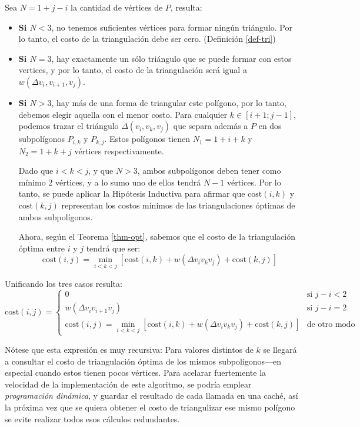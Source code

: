 \documentclass[tiny]{corsage}
\newcommand{\cost}[1]{\text{cost}(#1)}
\theoremstyle{plain}
\theoremstyle{definition}
\begin{document}
	Sea $N = 1 + j - i$ la cantidad de vértices de $P$, resulta:
	\begin{itemize}
		\item \textbf{Si $N < 3$}, no tenemos suficientes vértices para formar ningún triángulo.  Por lo tanto, el costo de la triangulación debe ser cero.  (Definición \ref{def-tri})
		\item \textbf{Si $N = 3$}, hay exactamente un sólo triángulo que se puede formar con estos vertices, y por lo tanto, el costo de la triangulación será igual a $w(\Delta{v_i,v_{i+1},v_j})$.
		\item \textbf{Si $N > 3$}, hay más de una forma de triangular este polígono, por lo tanto, debemos elegir aquella con el menor costo.  Para cualquier $k \in [i + 1; j - 1]$, podemos trazar el triángulo $\Delta(v_i,v_k,v_j)$ que separa además a $P$ en dos subpolígonos $P_{i,k}$ y $P_{k,j}$.  Estos polígonos tienen $N_1 = 1 + i + k$ y $N_2 = 1 + k + j$ vértices respectivamente.

			Dado que $i < k < j$, y que $N > 3$, ambos subpolígonos deben tener como mínimo 2 vértices, y a lo sumo uno de ellos tendrá $N - 1$ vértices.  Por lo tanto, se puede aplicar la Hipótesis Inductiva para afirmar que $\cost{i, k}$ y $\cost{k, j}$ representan los costos mínimos de las triangulaciones óptimas de ambos subpolígonos.

			Ahora, según el Teorema \ref{thm-opt}, sabemos que el costo de la triangulación óptima entre $i$ y $j$ tendrá que ser:
			\[ \cost{i, j} = \min_{i < k < j}{\left [ \cost{i, k} + w(\Delta{v_iv_kv_j}) + \cost{k, j} \right ]} \]
	\end{itemize}

	Unificando los tres casos resulta:
	\begin{equation}
		\cost{i, j} = \left \{ \begin{array}{ll}
			0 & \text{si } j - i < 2 \\
			w(\Delta{v_iv_{i + 1}v_j}) & \text{si } j - i = 2 \\
			\cost{i, j} = \displaystyle\min_{i < k < j}{\left [ \cost{i, k} + w(\Delta{v_iv_kv_j}) + \cost{k, j} \right ]} & \text{de otro modo}
		\end{array}\right .
		\label{def-cost}
	\end{equation}

	Nótese que esta expresión es muy recursiva:  Para valores distintos de $k$ se llegará a consultar el costo de triangulación óptima de los mismos subpolígonos---en especial cuando estos tienen pocos vértices.  Para acelarar fuertemente la velocidad de la implementación de este algoritmo, se podría emplear \emph{programación dinámica}, y guardar el resultado de cada llamada en una caché, así la próxima vez que se quiera obtener el costo de triangulizar ese mismo polígono se evite realizar todos esos cálculos redundantes.
\end{document}
